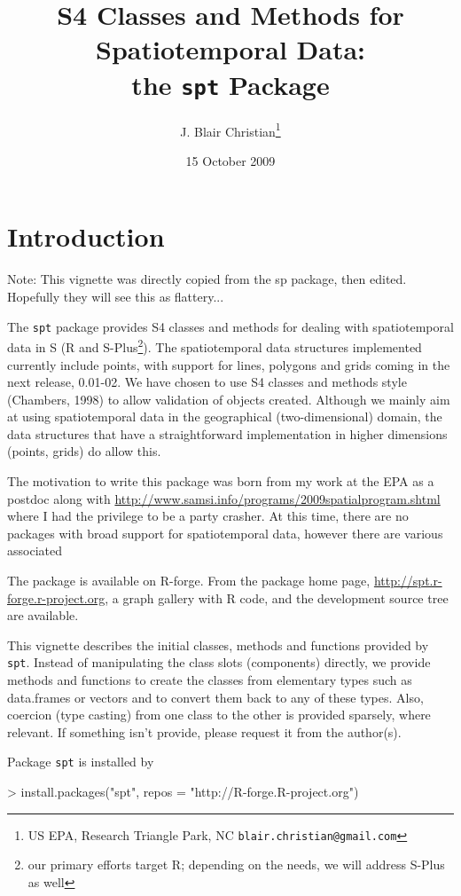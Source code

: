 \documentclass{article}
\title{ S4 Classes and Methods for Spatiotemporal Data:\\
the {\tt spt} Package }
\author{J. Blair Christian\footnote{US EPA,
Research Triangle Park, NC {\tt blair.christian@gmail.com}}}
\date{15 October 2009}
\begin{document}
\maketitle
\tableofcontents

\section*{Introduction}

Note: This vignette was directly copied from the sp package, then
edited.  Hopefully they will see this as flattery...

The {\tt spt} package provides S4 classes and methods for dealing with
spatiotemporal data in S (R and S-Plus\footnote{our primary efforts target R;
depending on the needs, we will address S-Plus as well}). The spatiotemporal
data structures implemented currently include points, with support for
lines, polygons and grids coming in the next release, 0.01-02.  We have chosen to use S4
classes and methods style (Chambers, 1998) to allow validation of objects
created. Although we mainly aim at using spatiotemporal data in the geographical
(two-dimensional) domain, the data structures that have a straightforward
implementation in higher dimensions (points, grids) do allow this.

The motivation to write this package was born from my work at the EPA as
a postdoc along with \href{the SAMSI program on Spatiotemporal
  analysis}{http://www.samsi.info/programs/2009spatialprogram.shtml}
where I had the privilege to be a party crasher.  At this time, there
are no packages with broad support for spatiotemporal data, however
there are various associated 

The package is available on R-forge. From the
package home page, \url{http://spt.r-forge.r-project.org}, a graph
gallery with R code, and the development source tree are available.

This vignette describes the initial classes, methods and functions provided
by \texttt{spt}. Instead of manipulating the class slots (components) directly,
we provide methods and functions to create the classes from elementary
types such as data.frames or vectors and to convert them back
to any of these types. Also, coercion (type casting) from one class to
the other is provided sparsely, where relevant.  If something isn't
provide, please request it from the author(s).

Package {\tt spt} is installed by 
\begin{Schunk}
\begin{Sinput}
> install.packages("spt", repos = "http://R-forge.R-project.org")
\end{Sinput}
\end{Schunk}
\end{document}
